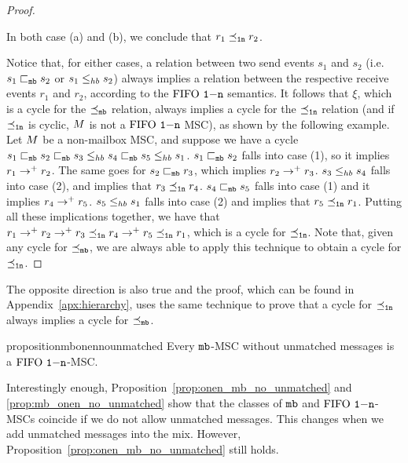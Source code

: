 \begin{proof}
\begin{enumerate}
\begin{enumerate}
	\end{enumerate}
	In both case (a) and (b), we conclude that $r_1 \preceq_{\mathtt{1n}} r_2$. %
\end{enumerate}
Notice that, for either cases, a relation between two send events $s_1$ and $s_2$ (i.e. $s_1 \sqsubset_{\mathtt{mb}} s_2$ or $s_1 \leq_{hb} s_2$) always implies a relation between the respective receive events $r_1$ and $r_2$, according to the $\text{FIFO } \mathtt{1\mathsf{-}n}$ semantics. It follows that $\xi$, which is a cycle for the $\preceq_{\mathtt{mb}}$ relation, always implies a cycle for the $\preceq_{\mathtt{1n}}$ relation (and if $\preceq_{\mathtt{1n}}$ is cyclic, $M$ is not a $\text{FIFO } \mathtt{1\mathsf{-}n}$ MSC), as shown by the following example. Let $M$ be a non-mailbox MSC, and suppose we have a cycle $s_1 \sqsubset_{\mathtt{mb}} s_2 \sqsubset_{\mathtt{mb}} s_3 \leq_{hb} s_4 \sqsubset_{\mathtt{mb}} s_5 \leq_{hb} s_1$. $s_1 \sqsubset_{\mathtt{mb}} s_2$ falls into case (1), so it implies $r_1 \to^+ r_2$. The same goes for $s_2 \sqsubset_{\mathtt{mb}} r_3$, which implies $r_2 \to^+ r_3$. $s_3 \leq_{hb} s_4$ falls into case (2), and implies that $r_3 \preceq_{\mathtt{1n}} r_4$. $s_4 \sqsubset_{\mathtt{mb}} s_5$ falls into case (1) and it implies $r_4 \to^+ r_5$. $s_5 \leq_{hb} s_1$ falls into case (2) and implies that $r_5 \preceq_{\mathtt{1n}} r_1$. Putting all these implications together, we have that $r_1 \to^+ r_2 \to^+ r_3 \preceq_{\mathtt{1n}} r_4 \to^+ r_5 \preceq_{\mathtt{1n}} r_1$, which is a cycle for $\preceq_{\mathtt{1n}}$. Note that, given any cycle for $\preceq_{\mathtt{mb}}$, we are always able to apply this technique to obtain a cycle for $\preceq_{\mathtt{1n}}$.
\end{proof}

The opposite direction is also true and the proof, which can be found in  Appendix~\ref{apx:hierarchy}, uses the same technique to prove that a cycle for $\preceq_{\mathtt{1n}}$ always implies a cycle for $\preceq_{\mathtt{mb}}$.

\begin{restatable}{proposition}{mbonennounmatched} 
\label{prop:mb_onen_no_unmatched}
	Every $\mathtt{mb}$-MSC without unmatched messages is a $\text{FIFO } \mathtt{1\mathsf{-}n}$-MSC.
\end{restatable}

Interestingly enough, Proposition~\ref{prop:onen_mb_no_unmatched} and \ref{prop:mb_onen_no_unmatched} show that the classes of $\mathtt{mb}$ and $\text{FIFO } \mathtt{1\mathsf{-}n}$-MSCs coincide if we do not allow unmatched messages.  This changes when we add unmatched messages into the mix. However, Proposition~\ref{prop:onen_mb_no_unmatched} still holds.


